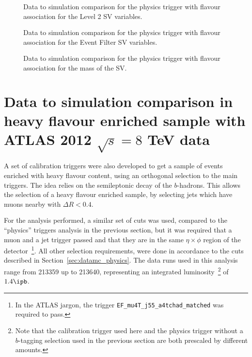 \begin{figure}[H]
\caption{Data to simulation comparison for the physics trigger with flavour association for the Level 2 SV variables.}
\label{fig:datamc_physics_flavour_sv_l2}
\end{figure}

\begin{figure}[H]
\caption{Data to simulation comparison for the physics trigger with flavour association for the Event Filter SV variables.}
\label{fig:datamc_physics_flavour_sv_ef}
\end{figure}

\begin{figure}[H]
\caption{Data to simulation comparison for the physics trigger with flavour association for the mass of the SV.}
\label{fig:datamc_physics_flavour_msv}
\end{figure}


\section{Data to simulation comparison in heavy flavour enriched sample with ATLAS 2012 $\sqrt{s} = 8$ TeV data}
\label{sec:datamc_calib}

A set of calibration triggers were also developed to get a sample of events enriched with heavy flavour content,
using an orthogonal selection to the main \bjet triggers. The idea relies on the semileptonic decay of the $b$-hadrons.
This allows the selection of a heavy flavour enriched sample,
by selecting jets which have muons nearby with $\Delta R < 0.4$.

For the analysis performed, a similar set of cuts was used, compared to the ``physics'' triggers analysis in the previous section,
but it was required that a muon and a jet trigger passed and that they are in the same $\eta \times \phi$ region of the detector~\footnote{In
the ATLAS jargon, the trigger
\texttt{EF\_mu4T\_j55\_a4tchad\_matched} was required to pass.}.
All other selection requirements, were done in accordance to the 
cuts described in Section~\ref{sec:datamc_physics}. The data runs used in this analysis range from 213359 up to 213640, representing
an integrated luminosity~\footnote{Note that the calibration trigger used here and the physics trigger without a $b$-tagging selection used in the
previous section are both prescaled by different amounts.} of $1.4 \ipb$.

